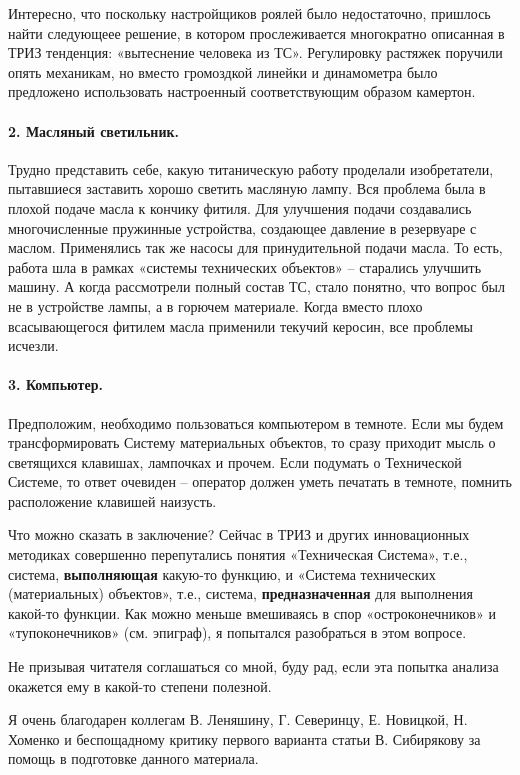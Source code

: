 \documentclass[11pt,a4paper]{article}
\begin{document}
Интересно, что поскольку настройщиков роялей было недостаточно, пришлось найти
следующеее решение, в котором прослеживается многократно описанная в ТРИЗ
тенденция: «вытеснение человека из ТС». Регулировку растяжек поручили опять
механикам, но вместо громоздкой линейки и динамометра было предложено
использовать настроенный соответствующим образом камертон.

\paragraph{2. Масляный светильник.}
Трудно представить себе, какую титаническую работу проделали изобретатели,
пытавшиеся заставить хорошо светить масляную лампу. Вся проблема была в плохой
подаче масла к кончику фитиля. Для улучшения подачи создавались многочисленные
пружинные устройства, создающее давление в резервуаре с маслом. Применялись
так же насосы для принудительной подачи масла. То есть, работа шла в рамках
«системы технических объектов» – старались улучшить машину. 
А когда рассмотрели полный состав ТС, стало понятно, что вопрос был не в
устройстве лампы, а в горючем материале. Когда вместо плохо всасывающегося
фитилем масла применили текучий керосин, все проблемы исчезли. 

\paragraph{3. Компьютер.}
Предположим, необходимо пользоваться компьютером в темноте. Если мы будем
трансформировать Систему материальных объектов, то сразу приходит мысль о
светящихся клавишах, лампочках и прочем. Если подумать о Технической Системе,
то ответ очевиден – оператор должен уметь печатать в темноте, помнить
расположение клавишей наизусть.


Что можно сказать в заключение? Сейчас в ТРИЗ и других инновационных методиках
совершенно перепутались понятия «Техническая Система», т.е., система,
\textbf{выполняющая} какую-то функцию, и «Система технических (материальных)
объектов», т.е., система, \textbf{предназначенная} для выполнения какой-то
функции. Как можно меньше вмешиваясь в спор «остроконечников» и
«тупоконечников» (см. эпиграф), я попытался разобраться в этом вопросе.

Не призывая читателя соглашаться со мной, буду рад, если эта попытка анализа
окажется ему в какой-то степени полезной.

Я очень благодарен коллегам В. Леняшину, Г. Северинцу, Е. Новицкой, Н. Хоменко
и беспощадному критику первого варианта статьи В. Сибирякову за помощь в
подготовке данного материала.
\end{document}
